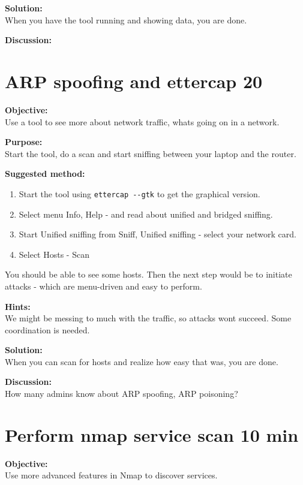 \documentclass[a4paper,11pt,notitlepage]{report}
\begin{document}
{\bf Solution:}\\
When you have the tool running and showing data, you are done.

{\bf Discussion:}\\


\chapter{ARP spoofing and ettercap 20}
\label{ex:arp-spoof-ettercap}



{\bf Objective:}\\
Use a tool to see more about network traffic, whats going on in a network.

{\bf Purpose:}\\
Start the tool, do a scan and start sniffing between your laptop and the router.

{\bf Suggested method:}
\begin{enumerate}
\item Start the tool using \verb+ettercap --gtk+ to get the graphical version.
\item Select menu Info, Help - and read about unified and bridged sniffing.
\item Start Unified sniffing from Sniff, Unified sniffing - select your network card.
\item Select Hosts - Scan
\end{enumerate}

You should be able to see some hosts. Then the next step would be to initiate attacks - which are menu-driven and easy to perform.

{\bf Hints:}\\
We might be messing to much with the traffic, so attacks wont succeed. Some coordination is needed.

{\bf Solution:}\\
When you can scan for hosts and realize how easy that was, you are done.

{\bf Discussion:}\\
How many admins know about ARP spoofing, ARP poisoning?


\chapter{Perform nmap service scan 10 min}
\label{ex:nmap-service}

{\bf Objective:} \\
Use more advanced features in Nmap to discover services.
\end{document}
